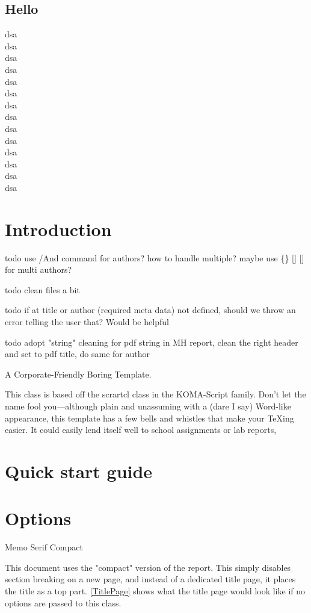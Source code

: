 \documentclass{corpboreport}
\begin{document}
	\subsection{Hello}
		dsa\\dsa\\dsa\\dsa\\dsa\\dsa\\dsa\\dsa\\dsa\\dsa\\dsa\\dsa\\dsa\\dsa\\

\section{Introduction}
todo use /And command for authors? how to handle multiple? maybe use \{\} [] [] for multi authors?

todo clean files a bit

todo if at title or author (required meta data) not defined, should we throw an error telling the user that? Would be helpful

todo adopt "string" cleaning for pdf string in MH report, clean the right header and set to pdf title, do same for author

A Corporate-Friendly Boring Template.

This class is based off the scrartcl class in the KOMA-Script family.
Don't let the name fool you---although plain and unassuming with a (dare I say) Word-like appearance,
this template has a few bells and whistles that make your TeXing easier.
It could easily lend itself well to school assignments or lab reports,

\section{Quick start guide}

\section{Options}
Memo
Serif
Compact


This document uses the "compact" version of the report. This simply disables section breaking on a new page,
and instead of a dedicated title page, it places the title as a top part. \cref{TitlePage} shows
what the title page would look like if no options are passed to this class.
\end{document}
